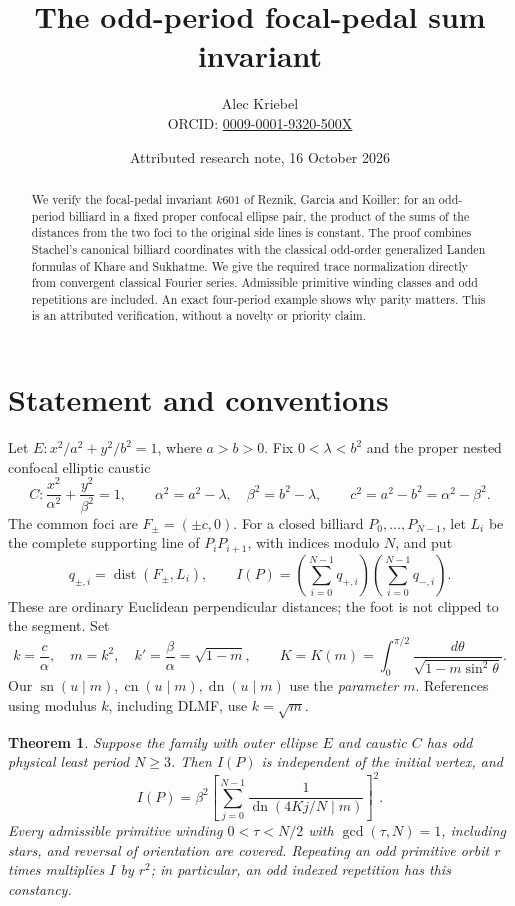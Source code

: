 \documentclass[11pt]{article}
\title{The odd-period focal-pedal sum invariant}
\author{Alec Kriebel\\
\small ORCID: \href{https://orcid.org/0009-0001-9320-500X}{0009-0001-9320-500X}}
\date{Attributed research note, 16 October 2026}
\newcommand{\sn}{\operatorname{sn}}
\newcommand{\cn}{\operatorname{cn}}
\newcommand{\dn}{\operatorname{dn}}
\newcommand{\dist}{\operatorname{dist}}
\newtheorem{theorem}{Theorem}
\begin{document}
\maketitle
\begin{abstract}
We verify the focal-pedal invariant \(k601\) of Reznik, Garcia and
Koiller: for an odd-period billiard in a fixed proper confocal ellipse
pair, the product of the sums of the distances from the two foci to
the original side lines is constant. The proof combines Stachel's
canonical billiard coordinates with the classical odd-order
generalized Landen formulas of Khare and Sukhatme. We give the required
trace normalization directly from convergent classical Fourier series.
Admissible primitive winding classes and odd repetitions are included.
An exact four-period example shows why parity matters. This is an
attributed verification, without a novelty or priority claim.
\end{abstract}

\section{Statement and conventions}

Let \(E:x^2/a^2+y^2/b^2=1\), where \(a>b>0\). Fix \(0<\lambda<b^2\) and
the proper nested confocal elliptic caustic
\[
 C:\frac{x^2}{\alpha^2}+\frac{y^2}{\beta^2}=1,\qquad
 \alpha^2=a^2-\lambda,\quad\beta^2=b^2-\lambda,\qquad
 c^2=a^2-b^2=\alpha^2-\beta^2.
\]
The common foci are \(F_\pm=(\pm c,0)\). For a closed billiard
\(P_0,\ldots,P_{N-1}\), let \(L_i\) be the complete supporting line of
\(P_iP_{i+1}\), with indices modulo \(N\), and put
\[
 q_{\pm,i}=\dist(F_\pm,L_i),\qquad
 I(P)=\left(\sum_{i=0}^{N-1}q_{+,i}\right)
       \left(\sum_{i=0}^{N-1}q_{-,i}\right).
\]
These are ordinary Euclidean perpendicular distances; the foot is not
clipped to the segment. Set
\[
 k=\frac c\alpha,\quad m=k^2,\quad k'=\frac\beta\alpha=\sqrt{1-m},
 \qquad K=K(m)=\int_0^{\pi/2}\frac{d\theta}{\sqrt{1-m\sin^2\theta}}.
\]
Our \(\sn(u\mid m),\cn(u\mid m),\dn(u\mid m)\) use the
\emph{parameter} \(m\). References using modulus \(k\), including DLMF,
use \(k=\sqrt m\).

\begin{theorem}\label{thm:main}
Suppose the family with outer ellipse \(E\) and caustic \(C\) has odd
physical least period \(N\geq3\). Then \(I(P)\) is independent of the
initial vertex, and
\begin{equation}\label{eq:constant}
 I(P)=\beta^2\left[
       \sum_{j=0}^{N-1}\frac1{\dn(4Kj/N\mid m)}\right]^2.
\end{equation}
Every admissible primitive winding \(0<\tau<N/2\) with
\(\gcd(\tau,N)=1\), including stars, and reversal of orientation are
covered. Repeating an odd primitive orbit \(r\) times multiplies \(I\)
by \(r^2\); in particular, an odd indexed repetition has this constancy.
\end{theorem}
\end{document}
